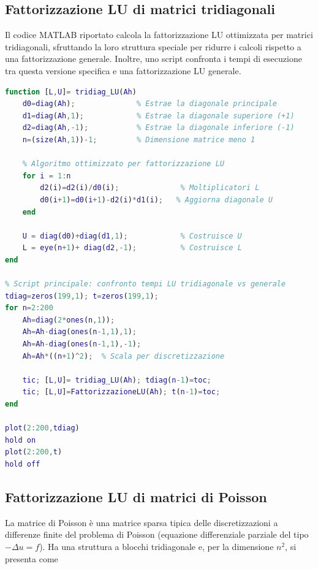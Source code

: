 \documentclass[12pt,a4paper]{article}
\begin{document}
\newpage
\subsection*{Fattorizzazione LU di matrici tridiagonali}

Il codice MATLAB riportato calcola la fattorizzazione LU ottimizzata per matrici tridiagonali, sfruttando la loro struttura speciale per ridurre i calcoli rispetto a una fattorizzazione generale. Inoltre, uno script confronta i tempi di esecuzione tra questa versione specifica e una fattorizzazione LU generale.

\begin{lstlisting}[language=Matlab]
% Funzione per calcolare la fattorizzazione LU di una matrice tridiagonale
function [L,U]= tridiag_LU(Ah)
    d0=diag(Ah);              % Estrae la diagonale principale
    d1=diag(Ah,1);            % Estrae la diagonale superiore (+1)
    d2=diag(Ah,-1);           % Estrae la diagonale inferiore (-1)
    n=(size(Ah,1))-1;         % Dimensione matrice meno 1
    
    % Algoritmo ottimizzato per fattorizzazione LU
    for i = 1:n
        d2(i)=d2(i)/d0(i);              % Moltiplicatori L
        d0(i+1)=d0(i+1)-d2(i)*d1(i);   % Aggiorna diagonale U
    end
    
    U = diag(d0)+diag(d1,1);            % Costruisce U
    L = eye(n+1)+ diag(d2,-1);          % Costruisce L
end

% Script principale: confronto tempi LU tridiagonale vs generale
tdiag=zeros(199,1); t=zeros(199,1);
for n=2:200
    Ah=diag(2*ones(n,1));
    Ah=Ah-diag(ones(n-1,1),1);
    Ah=Ah-diag(ones(n-1,1),-1);
    Ah=Ah*((n+1)^2);  % Scala per discretizzazione
    
    tic; [L,U]= tridiag_LU(Ah); tdiag(n-1)=toc;
    tic; [L,U]=FattorizzazioneLU(Ah); t(n-1)=toc;
end

plot(2:200,tdiag)
hold on
plot(2:200,t)
hold off
\end{lstlisting}


\newpage
\subsection*{Fattorizzazione LU di matrici di Poisson}

La matrice di Poisson è una matrice sparsa tipica delle discretizzazioni a differenze finite del problema di Poisson (equazione differenziale parziale del tipo \(-\Delta u = f\)). Ha una struttura a blocchi tridiagonale e, per la dimensione \(n^2\), si presenta come
\end{document}
